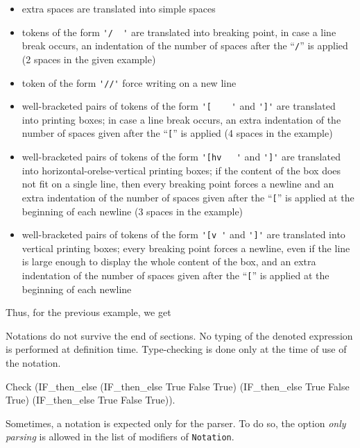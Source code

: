 \begin{itemize}
\item extra spaces are translated into simple spaces
\item tokens of the form \verb='/  '= are translated into breaking point,
  in case a line break occurs, an indentation of the number of spaces
  after the ``\verb=/='' is applied (2 spaces in the given example)
\item token of the form \verb='//'= force writing on a new line
\item well-bracketed pairs of tokens of the form \verb='[    '= and \verb=']'=
  are translated into printing boxes; in case a line break occurs,
  an extra indentation of the number of spaces given after the ``\verb=[=''
  is applied (4 spaces in the example)
\item well-bracketed pairs of tokens of the form \verb='[hv   '= and \verb=']'=
  are translated into horizontal-orelse-vertical printing boxes; 
  if the content of the box does not fit on a single line, then every breaking
  point forces a newline and an extra  indentation of the number of spaces
  given after the ``\verb=[='' is applied at the beginning of each newline
  (3 spaces in the example)
\item well-bracketed pairs of tokens of the form \verb='[v '= and
  \verb=']'= are translated into vertical printing boxes; every
  breaking point forces a newline, even if the line is large enough to
  display the whole content of the box, and an extra indentation of the
  number of spaces given after the ``\verb=[='' is applied at the beginning
  of each newline
\end{itemize}

Thus, for the previous example, we get

Notations do not survive the end of sections. No typing of the denoted
expression is performed at definition time. Type-checking is done only
at the time of use of the notation.

\begin{coq_example}
Check 
 (IF_then_else (IF_then_else True False True) 
   (IF_then_else True False True)
   (IF_then_else True False True)).   
\end{coq_example}

\Rem
Sometimes, a notation is expected only for the parser.
To do so, the option {\em only parsing} is allowed in the list of modifiers of
\texttt{Notation}.

